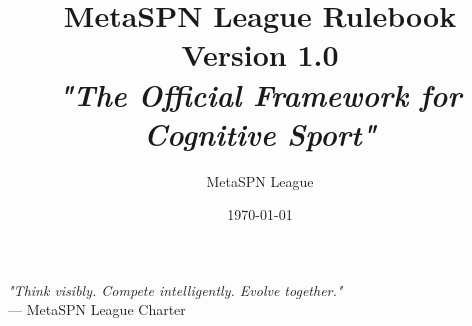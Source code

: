 \documentclass[11pt,letterpaper,twoside]{book}
\title{
  \Huge\textbf{MetaSPN League Rulebook}\\
  \vspace{0.5cm}
  \Large Version 1.0\\
  \vspace{0.3cm}
  \large\textit{"The Official Framework for Cognitive Sport"}
}
\author{MetaSPN League}
\date{\today}
\begin{document}
\maketitle
\thispagestyle{empty}

\tableofcontents
\clearpage














\appendix



\clearpage
\thispagestyle{empty}
\vspace*{\fill}
\begin{center}
\Large\textit{"Think visibly. Compete intelligently. Evolve together."}\\
\vspace{0.5cm}
\normalsize — MetaSPN League Charter
\end{center}
\vspace*{\fill}
\end{document}
